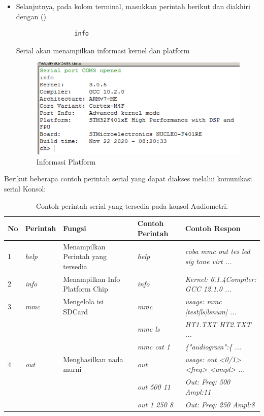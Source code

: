 \documentclass{article}
\begin{document}
\begin{enumerate}
\begin{itemize}
			\item Selanjutnya, pada kolom terminal,
			masukkan perintah berikut dan diakhiri dengan (\keys{\return})
			\begin{verbatim}
				info
			\end{verbatim}
			Serial akan menampilkan informasi kernel dan platform
			\begin{figure}[H]
				\centering
				\includegraphics[width=300pt]{images/software/hercules_text}
				\caption{Informasi Platform}
			\end{figure}
		\end{itemize}
		
	\end{enumerate}
	
	Berikut beberapa contoh perintah serial yang dapat diakses melalui komunikasi serial Konsol:
	
	\begin{table}[H]
		\renewcommand{\tablename}{Tabel}
		\centering
		\caption{Contoh perintah serial yang tersedia pada konsol Audiometri. \label{table:serial-code}}
		\begin{tabular}{| p{} | p{} | p{} | p{} | p{} |}
			\hline
			\textbf{No} & \textbf{Perintah} & \textbf{Fungsi} & \textbf{Contoh Perintah} & \textbf{Contoh Respon} \\
			\hline
			1 & \textit{help} & Menampilkan Perintah yang tersedia & \textit{help} & \textit{coba mmc out tes led sig tone virt ...} \\
			\hline
			2 & \textit{info} & Menampilkan Info Platform Chip & \textit{info} & \textit{Kernel: 6.1.4Compiler: GCC 12.1.0 ...} \\
			\hline
			3 & \textit{mmc} & Mengelola isi SDCard & \textit{mmc} & \textit{usage: mmc [test|ls|lsnum| ...} \\
			& & & \textit{mmc ls} & \textit{HT1.TXT HT2.TXT ...} \\
			& & & \textit{mmc cat 1} & \textit{\{"audiogram":\{ ...} \\
			\hline
			4 & \textit{out} & Menghasilkan nada murni &  \textit{out} & \textit{usage: out <0/1> <freq> <ampl> ...} \\
			& & & \textit{out 500 11} & \textit{Out: Freq:  500 Ampl:11} \\
			& & & \textit{out 1 250 8} & \textit{Out: Freq:  250 Ampl:8} \\
			\hline
		\end{tabular}
	\end{table}
	
\end{document}
